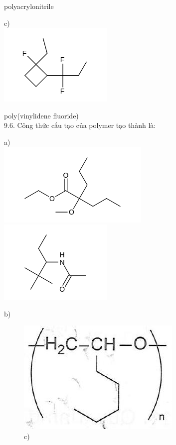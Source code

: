 \documentclass[10pt]{article}
\begin{document}
polyacrylonitrile

c)\\
\includegraphics{smile-0b7b17e7630920889859dea985c24ed5e2967b92}

poly(vinylidene fluoride)\\
9.6. Công thức cấu tạo của polymer tạo thành là:

a)\\
\includegraphics{smile-82fd5187fa6fb221389429bbb6b3a652ff63b4b1}\\
\includegraphics{smile-9e5ecf5f5f34812dd819f39d95810216d2d8a2d3}

b)

\begin{figure}[h]
\begin{center}
\captionsetup{labelformat=empty}
\caption{c)}
  \includegraphics[width=\textwidth]{2025_10_23_b4e16b74380d0f7e7700g-060(1)}
\end{center}
\end{figure}
\end{document}
